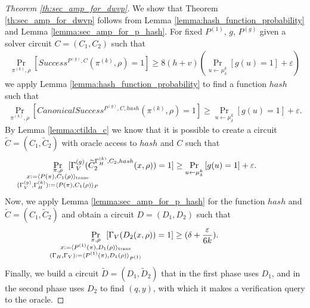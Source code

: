 \begin{proof}[Theorem \ref{th:sec_amp_for_dwvp}]
We show that Theorem \ref{th:sec_amp_for_dwvp} follows from Lemma \ref{lemma:hash_function_probability} and Lemma \ref{lemma:sec_amp_for_p_hash}.
For fixed $P^{(1)}$, $g$, $P^{(g)}$ given a solver circuit $C = (C_1, C_2)$ such that
\begin{align*}
    \underset{\pi^{(k)}, \rho}{\Pr}\left[Success^{P^{(g)}, C}(\pi^{(k)}, \rho) = 1\right] \geq 8(h+v)\left(\underset{u \leftarrow \mu_\delta^k}{\Pr}\left[g(u) = 1\right] + \varepsilon\right)
\end{align*}
we apply Lemma \ref{lemma:hash_function_probability} to find a function $hash$ such that
\begin{align*}
    \underset{\pi^{(k)}, \rho}{\Pr}\left[CanonicalSuccess^{P^{(g)}, C, hash}(\pi^{(k)}, \rho) = 1\right] \geq \underset{u \leftarrow \mu_\delta^k}{\Pr}\left[g(u) = 1\right] + \varepsilon.
\end{align*}
By Lemma \ref{lemma:ctilda_c} we know that it is possible to create a circuit $\widetilde{C} = (C_1, \widetilde{C}_2)$ with oracle access to $hash$ and $C$ such that
\begin{align*}
    \underset{
      \mathclap {
      \substack{\pi, \rho \\
        x := \langle P(\pi), C_1(\rho) \rangle_{\text{trans}} \\
        (\Gamma_V^{(g)}, \Gamma_H^{(k)}) := \langle P(\pi), C_1(\rho) \rangle_{P}
      }}}
    {\Pr}\mkern13mu[\Gamma_V^{(g)}(\widetilde{C}_2^{\Gamma_H^{(k)}, C_2, hash}(x, \rho)) = 1]
    \geq
\underset{u \leftarrow \mu_\delta^k}{\Pr}\left[g(u) = 1\right] + \varepsilon.
\end{align*}
Now, we apply Lemma \ref{lemma:sec_amp_for_p_hash} for the function $hash$ and $\widetilde{C} = (C_1, \widetilde{C}_2)$ and obtain a circuit $D = (D_1, D_2)$ such that
\begin{align}
  \label{eq:succ_prob_d}
    \underset{
      \mathclap{
      \substack{\pi, \rho \\ x := \langle P^{(1)}(\pi), D_1(\rho) \rangle_{\text{trans}} \\
        (\Gamma_H, \Gamma_V) := \langle P^{(1)}(\pi), D_1(\rho) \rangle_{P^{(1)}}}}}
    {\Pr}\mkern13mu[\Gamma_V(D_2(x, \rho)) = 1] \geq (\delta + \frac{\varepsilon}{6k}).
\end{align}
Finally, we build a circuit $\widetilde{D} = (D_1, \widetilde{D}_2)$ that in the first phase uses $D_1$, and in the second phase
uses $D_2$ to find $(q,y)$, with which it makes a verification query to the oracle.

\end{proof}
